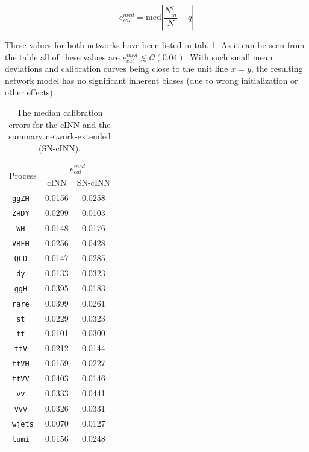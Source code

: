 \begin{equation*}
	e^{med}_{cal} = \text{med}\left|\frac{N^q_{in}}{N} - q\right|
\end{equation*}

These values for both networks have been listed in tab. \ref{tab:ecal_med}. As it can be seen from the table all of these values are $e^{med}_{cal}\lesssim\mathcal{O}(0.04)$. With such small mean deviations and calibration curves being close to the unit line $x=y$, the resulting network model has no significant inherent biases (due to wrong initialization or other effects).

\begin{table}[h!]
	\centering
	\begin{tabular}{ccc}
		\multirow{2}{*}{Process}& \multicolumn{2}{c}{$e^{med}_{cal}$} \\
		 & cINN & SN-cINN \\
		\hline
		\texttt{ggZH }   & 0.0156    &    0.0258  \\
		\texttt{ZHDY }   & 0.0299    &    0.0103  \\
		\texttt{WH   }   & 0.0148    &    0.0176  \\
		\texttt{VBFH }   & 0.0256    &    0.0428  \\
		\texttt{QCD  }   & 0.0147    &    0.0285  \\
		\texttt{dy   }   & 0.0133    &    0.0323  \\
		\texttt{ggH  }   & 0.0395    &    0.0183  \\
		\texttt{rare }   & 0.0399    &    0.0261  \\
		\texttt{st   }   & 0.0229    &    0.0323  \\
		\texttt{tt   }   & 0.0101    &    0.0300  \\
		\texttt{ttV  }   & 0.0212    &    0.0144  \\
		\texttt{ttVH }   & 0.0159    &    0.0227  \\
		\texttt{ttVV }   & 0.0403    &    0.0146  \\
		\texttt{vv   }   & 0.0333    &    0.0441  \\
		\texttt{vvv  }   & 0.0326    &    0.0331  \\
		\texttt{wjets}   & 0.0070    &    0.0127  \\
		\texttt{lumi }   & 0.0156    &    0.0248  \\
		\hline
	\end{tabular}
	\caption{The median calibration errors for the cINN and the summary network-extended (SN-cINN).}
	\label{tab:ecal_med}
\end{table}

\Subsection{\textcolor{red}{Network Predictions}}

\Subsection{\textcolor{red}{Benchmark Comparison}}